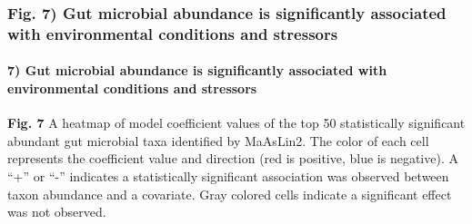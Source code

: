\documentclass[
]{article}
\begin{document}
\subsubsection{Fig. 7) Gut microbial abundance is significantly
associated with environmental conditions and
stressors}\label{fig.-7-gut-microbial-abundance-is-significantly-associated-with-environmental-conditions-and-stressors}

\paragraph{7) Gut microbial abundance is significantly associated with
environmental conditions and
stressors}\label{gut-microbial-abundance-is-significantly-associated-with-environmental-conditions-and-stressors}

\textbf{Fig. 7} A heatmap of model coefficient values of the top 50
statistically significant abundant gut microbial taxa identified by
MaAsLin2. The color of each cell represents the coefficient value and
direction (red is positive, blue is negative). A ``+'' or ``-''
indicates a statistically significant association was observed between
taxon abundance and a covariate. Gray colored cells indicate a
significant effect was not observed.
\end{document}
